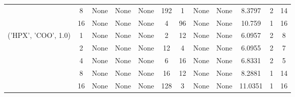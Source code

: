 \begin{tabular}{cccccccccccc}
& 8& None& None& None& 192& 1& None& None& 8.3797& 2& 14\\
& 16& None& None& None& 4& 96& None& None& 10.759& 1& 16\\
\hline
\multirow{5}{*}{('HPX', 'COO', 1.0)}& 1& None& None& None& 2& 12& None& None& 6.0957& 2& 8\\
& 2& None& None& None& 12& 4& None& None& 6.0955& 2& 7\\
& 4& None& None& None& 6& 16& None& None& 6.8331& 2& 5\\
& 8& None& None& None& 16& 12& None& None& 8.2881& 1& 14\\
& 16& None& None& None& 128& 3& None& None& 11.0351& 1& 16\\
\hline
\end{tabular}



